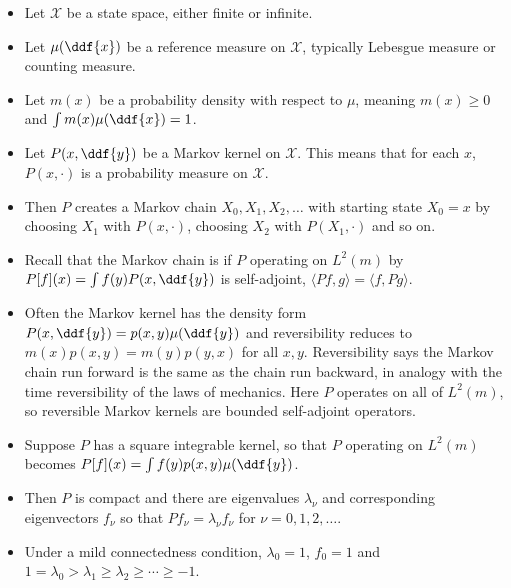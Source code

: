 \documentclass[12pt]{article}
\begin{document}
\begin{itemize}
    \item
        Let \( \mathcal{X} \) be a state space, either finite or
        infinite.
    \item
        Let \( \mu(\ddf{x}) \) be a reference measure on \( \mathcal{X} \),
        typically Lebesgue measure or counting measure.
    \item
        Let \( m(x) \) be a probability density with respect to \( \mu \),
        meaning \( m(x) \ge 0 \) and \( \int m(x) \mu(\ddf{x}) = 1 \).
    \item
        Let \( P(x, \ddf{y}) \) be a Markov kernel on \( \mathcal{X} \).
        This means that for each \( x \), \( P(x, \cdot) \) is a
        probability measure on \( \mathcal{X} \).
    \item
        Then \( P \) creates a Markov chain \( X_0, X_1, X_2, \dots \)
        with starting state \( X_0 = x \) by choosing \( X_1 \) with \(
        P(x, \cdot) \), choosing \( X_2 \) with \( P(X_{1}, \cdot) \)
        and so on.
    \item
        Recall that the Markov chain is  if \( P \)
        operating on \( L^2(m) \) by \( P[f](x) = \int f(y) P (x,\ddf{y})
        \) is self-adjoint, \( \langle Pf, g \rangle = \langle f,Pg
        \rangle \).
    \item
        Often the Markov kernel has the density form \( P(x,\ddf{y}) = p
        (x,y) \mu(\ddf{y}) \) and reversibility reduces to \( m(x)p(x,y)
        = m(y)p (y,x) \) for all \( x,y \).  Reversibility says the
        Markov chain run forward is the same as the chain run backward,
        in analogy with the time reversibility of the laws of mechanics.
        Here \( P \) operates on all of \( L^2(m) \), so reversible
        Markov kernels are bounded self-adjoint operators.
    \item
        Suppose \( P \) has a square integrable kernel, so that \( P \)
        operating on \( L^2(m) \) becomes \( P[f](x) = \int f(y) p(x,y)
        \mu(\ddf{y}) \).
    \item
        Then \( P \) is compact and there are eigenvalues \( \lambda_{\nu}
        \) and corresponding eigenvectors \( f_{\nu} \) so that \( Pf_{\nu}
        = \lambda_{\nu} f_{\nu} \) for \( \nu = 0,1,2, \dots \).
    \item
        Under a mild connectedness condition, \( \lambda_0 = 1 \), \( f_0
        = 1 \) and \( 1 = \lambda_0 > \lambda_1 \ge \lambda_2 \ge \cdots
        \ge -1 \).

\end{itemize}
\end{document}
